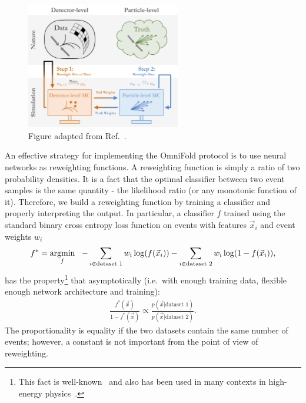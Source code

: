\begin{figure}[h!]
\centering
\includegraphics[width=0.6\textwidth]{Figures/schematic.pdf}
\caption{Figure adapted from Ref.~\cite{1911.09107}.}
\label{fig:omnifoldschematic}
\end{figure}

An effective strategy for implementing the OmniFold protocol is to use neural networks as reweighting functions.  A reweighting function is simply a ratio of two probability densities.  It is a fact that the optimal classifier between two event samples is the same quantity - the likelihood ratio (or any monotonic function of it).  Therefore, we build a reweighting function by training a classifier and properly interpreting the output. 
In particular, a classifier $f$ trained using the standard binary cross entropy loss function on events with features $\vec{x}_i$ and event weights $w_i$
%
\begin{align}
\label{eq:binarycrossentropy}
        f^*=\operatorname*{argmin}_f~~-\sum_{i\in\text{dataset 1}}w_i \log(f(\vec{x}_i)) -\sum_{i\in\text{dataset 2}} w_i\log(1-f(\vec{x}_i)),
\end{align}
%
has the property\footnote{This fact is well-known~\cite{hastie01statisticallearning,sugiyama_suzuki_kanamori_2012} and also has been used in many contexts in high-energy physics~\cite{2010.03569,1907.08209,Stoye:2018ovl,Hollingsworth:2020kjg,Brehmer:2018kdj,Brehmer:2018eca,Brehmer:2019xox,Brehmer:2018hga,Cranmer:2015bka,Badiali:2020wal,Andreassen:2020nkr,Andreassen:2019cjw,Fischer-ACAT2019}.} that asymptotically (i.e.\ with enough training data, flexible enough network architecture and training):
%
\begin{align}
\frac{f^*(\vec{x})}{1-f^*(\vec{x})}\propto \frac{p(\vec{x}|\text{dataset 1})}{p(\vec{x}|\text{dataset 2})}.
\end{align}
%
The proportionality is equality if the two datasets contain the same number of events; however, a constant is not important from the point of view of reweighting.

